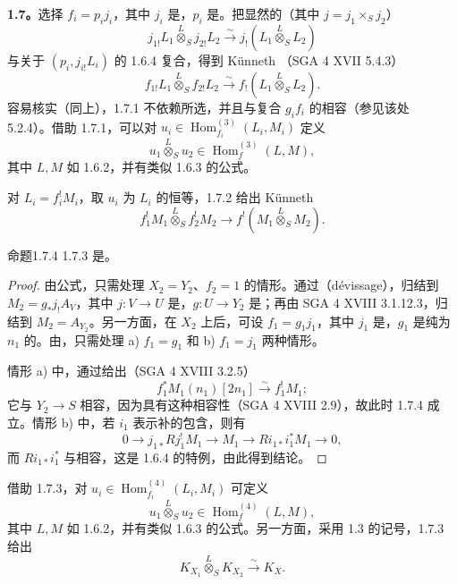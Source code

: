 \textbf{1.7。}选择 $f_i=p_i j_i$，其中 $j_i$ 是，$p_i$ 是。把显然的（其中 $j=j_1\times_S j_2$）
\[
j_{1!}L_1\mathbin{\overset L\otimes}_S j_{2!}L_2\xrightarrow\sim j_!(L_1\mathbin{\overset L\otimes}_S L_2)
\]
与关于 $(p_i,j_{i!}L_i)$ 的 1.6.4 复合，得到 Künneth （SGA 4 XVII 5.4.3）
\[
f_{1!}L_1\mathbin{\overset L\otimes}_S f_{2!}L_2\xrightarrow\sim f_!(L_1\mathbin{\overset L\otimes}_S L_2).\tag{1.7.1}
\]
容易核实（同上），1.7.1 不依赖所选，并且与复合 $g_i f_i$ 的相容（参见该处 5.2.4）。借助 1.7.1，可以对 $u_i\in\operatorname{Hom}^{(3)}_{f_i}(L_i,M_i)$ 定义
\[
u_1\mathbin{\overset L\otimes}_S u_2\in\operatorname{Hom}^{(3)}_f(L,M),\tag{1.7.2}
\]
其中 $L,M$ 如 1.6.2，并有类似 1.6.3 的公式。

对 $L_i=f_i^!M_i$，取 $u_i$ 为 $L_i$ 的恒等，1.7.2 给出 Künneth 
\[
f_1^!M_1\mathbin{\overset L\otimes}_S f_2^!M_2\longrightarrow
f^!(M_1\mathbin{\overset L\otimes}_S M_2).\tag{1.7.3}
\]
\begin{SGAresult}{命题}{1.7.4}
 1.7.3 是。
\end{SGAresult}
\begin{proof}
由公式，只需处理 $X_2=Y_2$、$f_2=1$ 的情形。通过（dévissage），归结到 $M_2=g_*j_!A_V$，其中 $j:V\to U$ 是，$g:U\to Y_2$ 是；再由 SGA 4 XVIII 3.1.12.3，归结到 $M_2=A_{Y_2}$。另一方面，在 $X_2$ 上后，可设 $f_1=g_1j_1$，其中 $j_1$ 是，$g_1$ 是纯为 $n_1$ 的。由，只需处理 a) $f_1=g_1$ 和 b) $f_1=j_1$ 两种情形。

情形 a) 中，通过给出（SGA 4 XVIII 3.2.5）
\[
f_1^*M_1(n_1)[2n_1]\xrightarrow\sim f_1^!M_1;
\]
它与 $Y_2\to S$ 相容，因为具有这种相容性（SGA 4 XVIII 2.9），故此时 1.7.4 成立。情形 b) 中，若 $i_1$ 表示补的包含，则有
\[
0\longrightarrow j_{1*}Rj_1^!M_1\longrightarrow M_1\longrightarrow Ri_{1*}i_1^*M_1\longrightarrow0,
\]
而 $Ri_{1*}i_1^*$ 与相容，这是 1.6.4 的特例，由此得到结论。
\end{proof}
借助 1.7.3，对 $u_i\in\operatorname{Hom}^{(4)}_{f_i}(L_i,M_i)$ 可定义
\[
u_1\mathbin{\overset L\otimes}_S u_2\in\operatorname{Hom}^{(4)}_f(L,M),\tag{1.7.5}
\]
其中 $L,M$ 如 1.6.2，并有类似 1.6.3 的公式。另一方面，采用 1.3 的记号，1.7.3 给出
\[
K_{X_1}\mathbin{\overset L\otimes}_S K_{X_2}\xrightarrow\sim K_X.\tag{1.7.6}
\]


